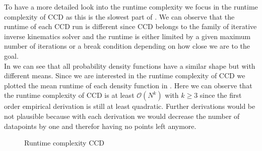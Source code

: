 To have a more detailed look into the runtime complexity we focus in the runtime complexity of CCD as this is the slowest part of . We can observe that the runtime of each CCD run is different since CCD belongs to the family of iterative inverse kinematics solver and the runtime is either limited by a given maximum number of iterations or a break condition depending on how close we are to the goal. \\
In  we can see that all probability density functions have a similar shape but with different means. Since we are interested in the runtime complexity of CCD we plotted the mean runtime of each density function in . Here we can observe that the runtime complexity of CCD is at least $\mathcal{O}(N^k)$ with $k \geq 3$ since the first order empirical derivation is still at least quadratic. Further derivations would be not plausible because with each derivation we would decrease the number of datapoints by one and therefor having no points left anymore.
\begin{figure}
    \begin{center}
        \hfill
    \end{center}
    \caption[Runtime complexity CCD]{Runtime complexity CCD}
    \label{fig:expert_dataset}
\end{figure}

